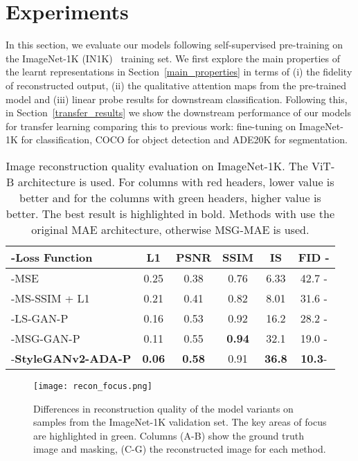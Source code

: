 \documentclass[10pt,twocolumn,letterpaper, cta-author]{article}
\begin{document}
\section{Experiments}
\label{results}

In this section, we evaluate our models following self-supervised pre-training on the ImageNet-1K (IN1K)~\cite{5206848} training set. We first explore the main properties of the learnt representations in Section~\ref{main_properties} in terms of (i) the fidelity of reconstructed output, (ii) the qualitative attention maps from the pre-trained model and (iii) linear probe results for downstream classification. Following this, in Section~\ref{transfer_results} we show the downstream performance of our models for transfer learning comparing this to previous work: fine-tuning on ImageNet-1K for classification, COCO for object detection and ADE20K for segmentation.

\begin{table}
\caption{Image reconstruction quality evaluation on ImageNet-1K. The ViT-B architecture is used. For columns with red headers, lower value is better and for the columns with green headers, higher value is better. The best result is highlighted in bold. Methods with  use the original MAE architecture, otherwise MSG-MAE is used.}
  \centering
  \small
  \begin{tabular}{>{\kern-\tabcolsep}lccccc<{\kern-\tabcolsep}}
    \toprule
    Loss Function & \cellcolor{pink} L1 & \cellcolor{lime} PSNR & \cellcolor{lime} SSIM & \cellcolor{lime} IS & \cellcolor{pink} FID \\ [0.5ex] 
     \midrule
     MSE  & 0.25 & 0.38 & 0.76 & 6.33 & 42.7 \\
     MS-SSIM + L1  & 0.21 & 0.41 & 0.82 & 8.01 & 31.6 \\
     LS-GAN-P  & 0.16 & 0.53 & 0.92 & 16.2 & 28.2 \\
     MSG-GAN-P & 0.11 & 0.55 & \textbf{0.94} & 32.1 & 19.0 \\
     \textbf{StyleGANv2-ADA-P} & \textbf{0.06} & \textbf{0.58} & 0.91 & \textbf{36.8} & \textbf{10.3}\\
    \bottomrule
  \end{tabular}
  \label{tab:table1}
\end{table}

\begin{figure*}[t]
    \centering
    \texttt{[image: recon\_focus.png]}
    \caption{Differences in reconstruction quality of the model variants on samples from the ImageNet-1K validation set. The key areas of focus are highlighted in green. Columns (A-B) show the ground truth image and masking, (C-G) the reconstructed image for each method.}
    \label{fig:recon_focus}
\end{figure*}
\end{document}
